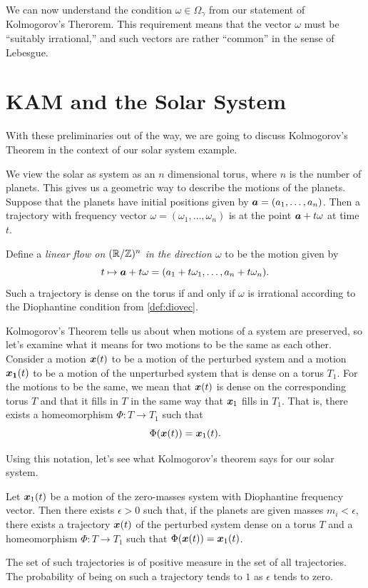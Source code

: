 \documentclass[twoside,letterpaper,10pt]{article}
\numberwithin{equation}{section}
\begin{document}
We can now understand the condition $\omega \in \Omega_{\gamma}$ from our
statement of Kolmogorov's Therorem.
This requirement means that the vector $\omega$ must be ``suitably irrational,''
and such vectors are rather ``common'' in the sense of Lebesgue.


\section{KAM and the Solar System}
\label{sec:kam-solar-system}

With these preliminaries out of the way, we are going to discuss Kolmogorov's
Theorem in the context of our solar system example.

We view the solar as system as an $n$ dimensional torus, where $n$ is the number
of planets.
This gives us a geometric way to describe the motions of the planets.
Suppose that the planets have initial positions given by $\bm{a} = (a_1, \ldots,
a_n)$.
Then a trajectory with frequency vector $\omega = (\omega_1, \ldots, \omega_n)$
is at the point $\bm{a} + t \omega$ at time $t$.

Define a \emph{linear flow on $(\mathbb{R}/\mathbb{Z})^n$ in the direction $\omega$} to be the
motion given by
\begin{equation*}
  t \mapsto \bm{a} + t \omega = (a_1 + t \omega_1, \ldots, a_n + t \omega_n).
\end{equation*}
Such a trajectory is dense on the torus if and only if $\omega$ is irrational
according to the Diophantine condition from \cref{def:diovec}.

Kolmogorov's Theorem tells us about when motions of a system are preserved, so
let's examine what it means for two motions to be the same as each other.
Consider a motion $\bm{x}(t)$ to be a motion of the perturbed system and a
motion $\bm{x_1}(t)$ to be a motion of the unperturbed system that is dense on a
torus $T_1$.
For the motions to be the same, we mean that $\bm{x}(t)$ is dense on the
corresponding torus $T$ and that it fills in $T$ in the same way that $\bm{x}_1$
fills in $T_1$.
That is, there exists a homeomorphism $\Phi : T \to T_1$ such that
\begin{equation*}
  \Phi(\bm{x}(t)) = \bm{x}_1(t).
\end{equation*}

Using this notation, let's see what Kolmogorov's theorem says for our solar
system.
\begin{thm}
  Let $\bm{x}_1(t)$ be a motion of the zero-masses system with Diophantine
  frequency vector.
  Then there exists $\epsilon > 0$ such that, if the planets are given masses
  $m_i < \epsilon$, there exists a trajectory $\bm{x}(t)$ of the perturbed
  system dense on a torus $T$ and a homeomorphism $\Phi : T \to T_1$ such that
  $\Phi(\bm{x}(t)) = \bm{x}_1(t)$.

  The set of such trajectories is of positive measure in the set of all
  trajectories.
  The probability of being on such a trajectory tends to $1$ as $\epsilon$ tends
  to zero.
\end{thm}
\end{document}
